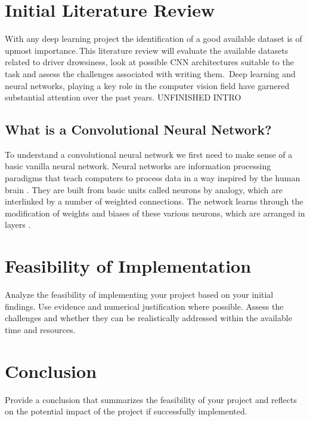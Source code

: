 \documentclass[a4paper, 11pt, twocolumn]{article}
\begin{document}
\section{Initial Literature Review}
\label{sec:litreview}
With any deep learning project the identification of a good available dataset is of upmost importance.\,This literature review will evaluate the available datasets related to driver
drowsiness, look at possible CNN architectures suitable to the task and assess the challenges associated with writing them.\, Deep learning and neural networks, playing a key role in
 the computer vision field have garnered substantial attention over the past years. UNFINISHED INTRO

\subsection{What is a Convolutional Neural Network?}
To understand a convolutional neural network we first need to make sense of a basic vanilla neural network. Neural networks are information processing paradigms that teach computers to
 process data in a way inspired by the human brain \citep{abiodun2018state}. They are built from basic units called neurons by analogy, which are interlinked by a number of weighted connections. The network
  learns through the modification of weights and biases of these various neurons, which are arranged in layers \citep{abdi1999neural}. 





\section{Feasibility of Implementation}
\label{sec:feasibility}
Analyze the feasibility of implementing your project based on your initial findings. Use evidence and numerical justification where possible. Assess the challenges and whether they can be realistically addressed within the available time and resources.

\section{Conclusion}
\label{sec:conclusion}
Provide a conclusion that summarizes the feasibility of your project and reflects on the potential impact of the project if successfully implemented.

\onecolumn
\end{document}
